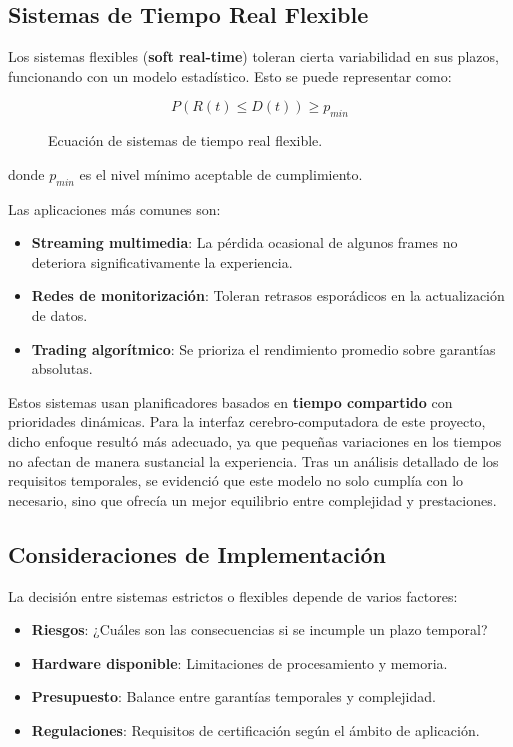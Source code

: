     \newpage
    \subsection{Sistemas de Tiempo Real Flexible}
        Los sistemas flexibles (\textbf{soft real-time}) toleran cierta variabilidad en sus plazos, funcionando con un modelo estadístico. Esto se puede representar como:

        \begin{figure}[h!]
            \centering
            \begin{equation}
                P(R(t) \leq D(t)) \geq p_{min}
            \end{equation}            \caption{Ecuación de sistemas de tiempo real flexible.}
            \label{fig:soft_real_time_equation}
        \end{figure}

        donde $p_{min}$ es el nivel mínimo aceptable de cumplimiento.

        Las aplicaciones más comunes son:
        \begin{itemize}
            \item \textbf{Streaming multimedia}: La pérdida ocasional de algunos frames no deteriora significativamente la experiencia.
            \item \textbf{Redes de monitorización}: Toleran retrasos esporádicos en la actualización de datos.
            \item \textbf{Trading algorítmico}: Se prioriza el rendimiento promedio sobre garantías absolutas.
        \end{itemize}

        Estos sistemas usan planificadores basados en \textbf{tiempo compartido} con prioridades dinámicas. Para la interfaz cerebro-computadora de este proyecto, dicho enfoque resultó más adecuado, ya que pequeñas variaciones en los tiempos no afectan de manera sustancial la experiencia. Tras un análisis detallado de los requisitos temporales, se evidenció que este modelo no solo cumplía con lo necesario, sino que ofrecía un mejor equilibrio entre complejidad y prestaciones.

    \subsection{Consideraciones de Implementación}
        La decisión entre sistemas estrictos o flexibles depende de varios factores:
        \begin{itemize}
            \item \textbf{Riesgos}: ¿Cuáles son las consecuencias si se incumple un plazo temporal?
            \item \textbf{Hardware disponible}: Limitaciones de procesamiento y memoria.
            \item \textbf{Presupuesto}: Balance entre garantías temporales y complejidad.
            \item \textbf{Regulaciones}: Requisitos de certificación según el ámbito de aplicación.
        \end{itemize}

